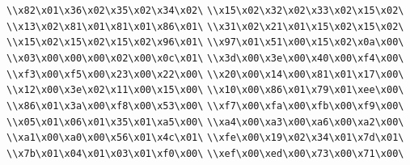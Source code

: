 \verb|\\x82\x01\x36\x02\x35\x02\x34\x02\|\newline
\verb|\\x15\x02\x32\x02\x33\x02\x15\x02\|\newline
\verb|\\x13\x02\x81\x01\x81\x01\x86\x01\|\newline
\verb|\\x31\x02\x21\x01\x15\x02\x15\x02\|\newline
\verb|\\x15\x02\x15\x02\x15\x02\x96\x01\|\newline
\verb|\\x97\x01\x51\x00\x15\x02\x0a\x00\|\newline
\verb|\\x03\x00\x00\x00\x02\x00\x0c\x01\|\newline
\verb|\\x3d\x00\x3e\x00\x40\x00\xf4\x00\|\newline
\verb|\\xf3\x00\xf5\x00\x23\x00\x22\x00\|\newline
\verb|\\x20\x00\x14\x00\x81\x01\x17\x00\|\newline
\verb|\\x12\x00\x3e\x02\x11\x00\x15\x00\|\newline
\verb|\\x10\x00\x86\x01\x79\x01\xee\x00\|\newline
\verb|\\x86\x01\x3a\x00\xf8\x00\x53\x00\|\newline
\verb|\\xf7\x00\xfa\x00\xfb\x00\xf9\x00\|\newline
\verb|\\x05\x01\x06\x01\x35\x01\xa5\x00\|\newline
\verb|\\xa4\x00\xa3\x00\xa6\x00\xa2\x00\|\newline
\verb|\\xa1\x00\xa0\x00\x56\x01\x4c\x01\|\newline
\verb|\\xfe\x00\x19\x02\x34\x01\x7d\x01\|\newline
\verb|\\x7b\x01\x04\x01\x03\x01\xf0\x00\|\newline
\verb|\\xef\x00\xed\x00\x73\x00\x71\x00\|\newline
